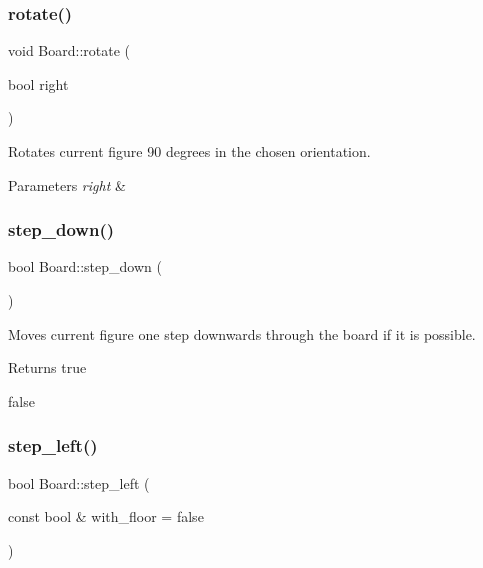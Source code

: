 \subsubsection{\texorpdfstring{rotate()}{rotate()}}
{\footnotesize\ttfamily void Board\+::rotate (\begin{DoxyParamCaption}\item[{bool}]{right }\end{DoxyParamCaption})}



Rotates current figure 90 degrees in the chosen orientation. 


\begin{DoxyParams}{Parameters}
{\em right} & \\
\hline
\end{DoxyParams}
\mbox{\label{classBoard_a0360b829ce0edb5cd2bf805efda5503c}} 
\subsubsection{\texorpdfstring{step\+\_\+down()}{step\_down()}}
{\footnotesize\ttfamily bool Board\+::step\+\_\+down (\begin{DoxyParamCaption}{ }\end{DoxyParamCaption})}



Moves current figure one step downwards through the board if it is possible. 

\begin{DoxyReturn}{Returns}
true 

false 
\end{DoxyReturn}
\mbox{\label{classBoard_a92063a57cdec4f6b66aa43b7bd517e59}} 
\subsubsection{\texorpdfstring{step\+\_\+left()}{step\_left()}}
{\footnotesize\ttfamily bool Board\+::step\+\_\+left (\begin{DoxyParamCaption}\item[{const bool \&}]{with\+\_\+floor = {\ttfamily false} }\end{DoxyParamCaption})}




